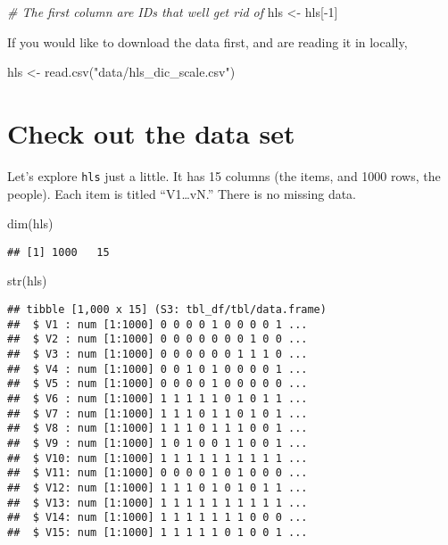 \documentclass[
]{book}
\newenvironment{Shaded}{\begin{snugshade}}{\end{snugshade}}
\newcommand{\CommentTok}[1]{\textcolor[rgb]{0.56,0.35,0.01}{\textit{#1}}}
\newcommand{\DecValTok}[1]{\textcolor[rgb]{0.00,0.00,0.81}{#1}}
\newcommand{\FunctionTok}[1]{\textcolor[rgb]{0.00,0.00,0.00}{#1}}
\newcommand{\NormalTok}[1]{#1}
\newcommand{\OtherTok}[1]{\textcolor[rgb]{0.56,0.35,0.01}{#1}}
\newcommand{\SpecialCharTok}[1]{\textcolor[rgb]{0.00,0.00,0.00}{#1}}
\newcommand{\StringTok}[1]{\textcolor[rgb]{0.31,0.60,0.02}{#1}}
\begin{document}
\begin{Shaded}
\begin{Highlighting}[]
\CommentTok{\# The first column are IDs that we\textquotesingle{}ll get rid of}
\NormalTok{hls }\OtherTok{\textless{}{-}}\NormalTok{ hls[}\SpecialCharTok{{-}}\DecValTok{1}\NormalTok{]}
\end{Highlighting}
\end{Shaded}

If you would like to download the data first, and are reading it in locally,

\begin{Shaded}
\begin{Highlighting}[]
\NormalTok{hls }\OtherTok{\textless{}{-}} \FunctionTok{read.csv}\NormalTok{(}\StringTok{"data/hls\_dic\_scale.csv"}\NormalTok{)}
\end{Highlighting}
\end{Shaded}

\hypertarget{check-out-the-data-set}{%
\section{Check out the data set}\label{check-out-the-data-set}}

Let's explore \texttt{hls} just a little. It has 15 columns (the items, and 1000 rows, the people). Each item is titled ``V1\ldots vN.'' There is no missing data.

\begin{Shaded}
\begin{Highlighting}[]
\FunctionTok{dim}\NormalTok{(hls)}
\end{Highlighting}
\end{Shaded}

\begin{verbatim}
## [1] 1000   15
\end{verbatim}

\begin{Shaded}
\begin{Highlighting}[]
\FunctionTok{str}\NormalTok{(hls)}
\end{Highlighting}
\end{Shaded}

\begin{verbatim}
## tibble [1,000 x 15] (S3: tbl_df/tbl/data.frame)
##  $ V1 : num [1:1000] 0 0 0 0 1 0 0 0 0 1 ...
##  $ V2 : num [1:1000] 0 0 0 0 0 0 0 1 0 0 ...
##  $ V3 : num [1:1000] 0 0 0 0 0 0 1 1 1 0 ...
##  $ V4 : num [1:1000] 0 0 1 0 1 0 0 0 0 1 ...
##  $ V5 : num [1:1000] 0 0 0 0 1 0 0 0 0 0 ...
##  $ V6 : num [1:1000] 1 1 1 1 1 0 1 0 1 1 ...
##  $ V7 : num [1:1000] 1 1 1 0 1 1 0 1 0 1 ...
##  $ V8 : num [1:1000] 1 1 1 0 1 1 1 0 0 1 ...
##  $ V9 : num [1:1000] 1 0 1 0 0 1 1 0 0 1 ...
##  $ V10: num [1:1000] 1 1 1 1 1 1 1 1 1 1 ...
##  $ V11: num [1:1000] 0 0 0 0 1 0 1 0 0 0 ...
##  $ V12: num [1:1000] 1 1 1 0 1 0 1 0 1 1 ...
##  $ V13: num [1:1000] 1 1 1 1 1 1 1 1 1 1 ...
##  $ V14: num [1:1000] 1 1 1 1 1 1 1 0 0 0 ...
##  $ V15: num [1:1000] 1 1 1 1 1 0 1 0 0 1 ...
\end{verbatim}
\end{document}
